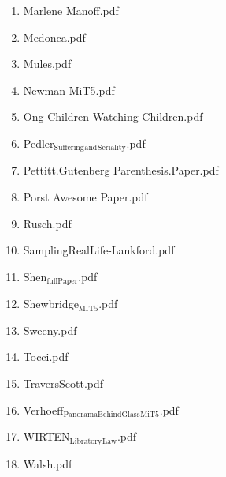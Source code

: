 \documentclass[11pt]{article}
\begin{document}
\begin{enumerate}
\begin{enumerate}
\begin{enumerate}
\item Marlene Manoff.pdf
\label{sec-1-1-1-1-11-24-41-1-2-14}

\item Medonca.pdf
\label{sec-1-1-1-1-11-24-41-1-2-15}

\item Mules.pdf
\label{sec-1-1-1-1-11-24-41-1-2-16}

\item Newman-MiT5.pdf
\label{sec-1-1-1-1-11-24-41-1-2-17}

\item Ong Children Watching Children.pdf
\label{sec-1-1-1-1-11-24-41-1-2-18}

\item Pedler$_{\text{Suffering}}$$_{\text{and}}$$_{\text{Seriality}}$.pdf
\label{sec-1-1-1-1-11-24-41-1-2-19}

\item Pettitt.Gutenberg Parenthesis.Paper.pdf
\label{sec-1-1-1-1-11-24-41-1-2-20}

\item Porst Awesome Paper.pdf
\label{sec-1-1-1-1-11-24-41-1-2-21}

\item Rusch.pdf
\label{sec-1-1-1-1-11-24-41-1-2-22}

\item SamplingRealLife-Lankford.pdf
\label{sec-1-1-1-1-11-24-41-1-2-23}

\item Shen$_{\text{fullPaper}}$.pdf
\label{sec-1-1-1-1-11-24-41-1-2-24}

\item Shewbridge$_{\text{MIT5}}$.pdf
\label{sec-1-1-1-1-11-24-41-1-2-25}

\item Sweeny.pdf
\label{sec-1-1-1-1-11-24-41-1-2-26}

\item Tocci.pdf
\label{sec-1-1-1-1-11-24-41-1-2-27}

\item TraversScott.pdf
\label{sec-1-1-1-1-11-24-41-1-2-28}

\item Verhoeff$_{\text{PanoramaBehindGlass}}$$_{\text{MiT5}}$.pdf
\label{sec-1-1-1-1-11-24-41-1-2-29}

\item WIRTEN$_{\text{Libratory}}$$_{\text{Law}}$.pdf
\label{sec-1-1-1-1-11-24-41-1-2-30}

\item Walsh.pdf
\label{sec-1-1-1-1-11-24-41-1-2-31}


\end{enumerate}
\end{enumerate}
\end{enumerate}
\end{document}
